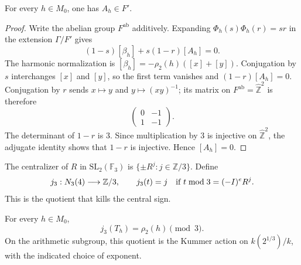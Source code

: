 \begin{lemma}\label{lem:cubic-two-pure-frame}
For every $h\in M_0$, one has $A_h\in F'$.
\end{lemma}

\begin{proof}
Write the abelian group $F^{\mathrm{ab}}$ additively.
Expanding $\Phi_h(s)\Phi_h(r)=sr$ in the extension
$\Gamma/F'$ gives
\[
 (1-s)[\beta_h]+s(1-r)[A_h]=0.
\]
The harmonic normalization is
$[\beta_h]=-\rho_2(h)([x]+[y])$.
Conjugation by $s$ interchanges $[x]$ and $[y]$, so the first
term vanishes and $(1-r)[A_h]=0$.
Conjugation by $r$ sends
$x\mapsto y$ and $y\mapsto(xy)^{-1}$; its matrix on
$F^{\mathrm{ab}}=\widehat{\mathbb Z}^2$ is therefore
\[
 \begin{pmatrix}0&-1\\1&-1\end{pmatrix}.
\]
The determinant of $1-r$ is $3$.  Since multiplication by $3$
is injective on $\widehat{\mathbb Z}^2$, the adjugate identity
shows that $1-r$ is injective.  Hence $[A_h]=0$.
\end{proof}

The centralizer of $R$ in $\mathrm{SL}_2(\mathbb F_3)$ is
$\{\pm R^j:j\in\mathbb Z/3\}$.  Define
\[
 j_3:N_3(4)\longrightarrow\mathbb Z/3,\qquad
 j_3(t)=j\quad\hbox{if }t\bmod3=(-I)^eR^j .
\]
This is the quotient that kills the central sign.

\begin{proposition}\label{prop:cubic-two-compatibility}
For every $h\in M_0$,
\[
 j_3(T_h)=\rho_2(h)\pmod3.
\]
On the arithmetic subgroup, this quotient is the Kummer action
on $k(2^{1/3})/k$, with the indicated choice of exponent.
\end{proposition}

